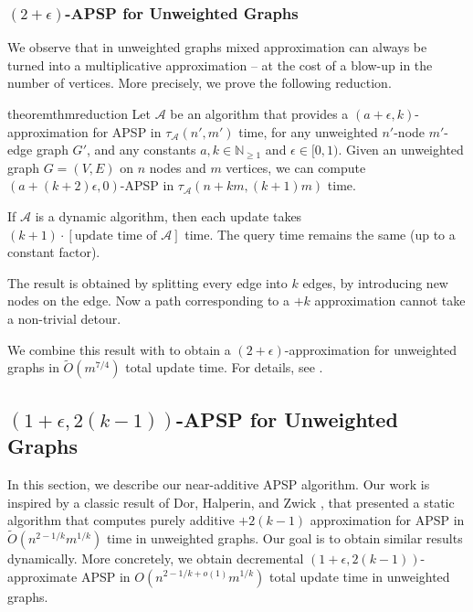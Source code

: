 \documentclass[11pt]{article}
\makeatletter
\theoremstyle{definition}
\theoremstyle{remark}
\renewcommand{\paragraph}{%
  \@startsection{paragraph}{4}%
  {\z@}{1.4ex \@plus 1ex \@minus .2ex}{-1em}%
  {\normalfont\normalsize\bfseries}%
}
\makeatother
\begin{document}
\subsubsection{\texorpdfstring{$(2+\epsilon)$}{(2+epsilon)}-APSP for Unweighted Graphs} 
We observe that in unweighted graphs mixed approximation can always be turned into a multiplicative approximation -- at the cost of a blow-up in the number of vertices. More precisely, we prove the following reduction. 
\begin{restatable}{theorem}{thmreduction}\label{thm:reduction}
   Let $\mathcal A$ be an algorithm that provides a $(a+\epsilon,k)$-approximation for APSP in $\tau_{\mathcal A}(n',m')$ time, for any unweighted $n'$-node $m'$-edge graph $G'$, and any constants  $a,k\in \mathbb N_{\geq 1}$ and $\epsilon\in[0,1)$. Given an unweighted graph $G=(V,E)$ on $n$ nodes and $m$ vertices, we can compute $(a+(k+2)\epsilon,0)$-APSP in $\tau_{\mathcal A}(n+km,(k+1)m)$ time. 

    If $\mathcal A$ is a dynamic algorithm, then each update takes $(k+1)\cdot [\text{update time of }\mathcal A]$ time. The query time remains the same (up to a constant factor). 
\end{restatable}
The result is obtained by splitting every edge into $k$ edges, by introducing new nodes on the edge. Now a path corresponding to a $+k$ approximation cannot take a non-trivial detour. 

We combine this result with  to obtain a $(2+\epsilon)$-approximation for unweighted graphs in $\tilde O(m^{7/4})$ total update time. For details, see .




\subsection{\texorpdfstring{$(1+\epsilon, 2(k-1))$}{(1+epsilon,2(k-1))}-APSP for Unweighted Graphs} \label{sec:add_overview}


In this section, we describe our near-additive APSP algorithm.
Our work is inspired by a classic result of Dor, Halperin, and Zwick \cite{DHZ00}, that presented a static algorithm that computes purely additive $+2(k-1)$ approximation for APSP in $\tilde{O}(n^{2-1/k}m^{1/k})$ time in unweighted graphs. Our goal is to obtain similar results dynamically. 
More concretely, we obtain decremental $(1+\epsilon,2(k-1))$-approximate APSP in $O(n^{2-1/k+o(1)}m^{1/k})$ total update time in unweighted graphs.
\end{document}
